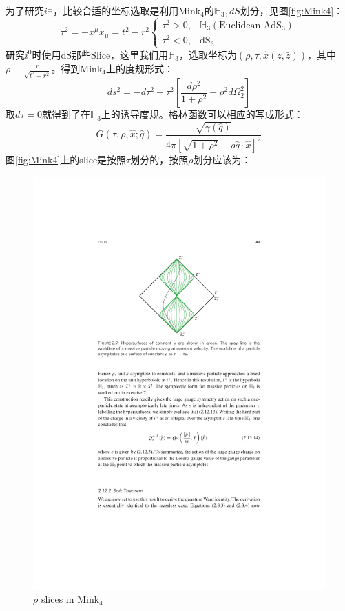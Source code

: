 为了研究$i^\pm$，比较合适的坐标选取是利用Mink$_4$的$\mathbb{H}_3,dS$划分，见图\ref{fig:Mink4}：
\begin{equation}
	\tau^2=-x^\mu x_\mu=t^2-r^2\begin{cases}\tau^2>0,&\mathbb{H}_3(\text{Euclidean AdS}_3)\\\tau^2<0,&\text{dS}_3\end{cases}
\end{equation}
研究$i^0$时使用dS那些Slice，这里我们用$\mathbb{H}_3$，选取坐标为$(\rho,\tau,\hat x (z,\bar z))$，其中$\rho\equiv\frac r{\sqrt{t^2-r^2}}$。得到Mink$_{4}$上的度规形式：
\begin{equation}
ds^2=-d\tau^2+\tau^2\left[\frac{d\rho^2}{1+\rho^2}+\rho^2d\Omega_2^2\right]
\end{equation}
取$d\tau=0$就得到了在$\mathbb{H}_3$上的诱导度规。格林函数可以相应的写成形式：
\begin{equation}
	G(\tau,\rho,\hat{x};\hat{q})=\frac{\sqrt{\gamma(\hat{q})}}{4\pi\left[\sqrt{1+\rho^2}-\rho\hat{q}\cdot\hat{x}\right]^2}
\end{equation}
图\ref{fig:Mink4}上的slice是按照$\tau$划分的，按照$\rho$划分应该为：
\begin{figure}[H]
	\centering
	\includegraphics{figs/fig7.pdf}
	\caption{$\rho$ slices in Mink$_{4}$}
\end{figure}
